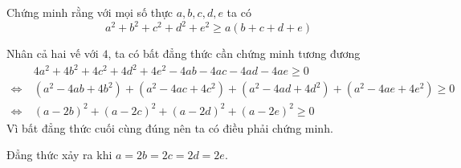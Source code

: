 \begin{problem}
    Chứng minh rằng với mọi số thực $a, b, c, d, e$ ta có
    $$
        a^2 + b^2 + c^2 + d^2 + e^2 \ge a(b + c + d + e)
    $$
    \solution
    
    Nhân cả hai vế với $4$, ta có bất đẳng thức cần chứng minh tương đương
    \begin{align*}
        &4a^2 + 4b^2 + 4c^2 + 4d^2 + 4e^2 - 4ab - 4ac - 4ad - 4ae \ge 0 \\
        \Leftrightarrow \ &(a^2 - 4ab + 4b^2) + (a^2 - 4ac + 4c^2) + (a^2 - 4ad + 4d^2) + (a^2 - 4ae + 4e^2) \ge 0 \\ 
        \Leftrightarrow \ &(a - 2b)^2 + (a - 2c)^2 + (a - 2d)^2 + (a - 2e)^2 \ge 0
    \end{align*}
    Vì bất đẳng thức cuối cùng đúng nên ta có điều phải chứng minh.
    
    Đẳng thức xảy ra khi $a = 2b = 2c = 2d = 2e$.
\end{problem}
